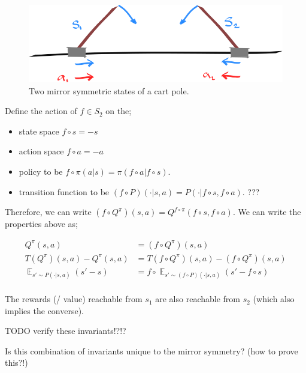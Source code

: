 \begin{figure}[h!]
	\centering
	\includegraphics[width=1\textwidth,height=0.25\textheight]{../../pictures/drawings/cart-pole-mirror.png}
	\caption{Two mirror symmetric states of a cart pole.}
\end{figure}

Define the action of $f \in S_2$ on the;

\begin{itemize}
	\tightlist
	\item state space $f \circ s = -s$
	\item action space $f \circ a = -a$
 	\item policy to be $f \circ \pi(a | s) = \pi(f \circ a | f \circ s)$.
	\item transition function to be $(f \circ P)(\cdot | s, a) = P(\cdot| f \circ s, f \circ a)$. ???
\end{itemize}

Therefore, we can write $(f \circ Q^{\pi})(s, a) = Q^{f \circ \pi}(f \circ s, f \circ a)$.
We can write the properties above as;

\begin{align*}
Q^\pi(s, a) &= (f \circ Q^{\pi})(s, a) \tag{expected return}\\
T(Q^\pi)(s,a) - Q^\pi(s,a) &=T(f \circ Q^\pi)(s, a) - (f \circ Q^\pi)(s,a) \tag{Bellman residual}\\
\mathop{\mathbb E}_{s' \sim P(\cdot| s, a)} (s' - s) &= f \circ \mathop{\mathbb E}_{s' \sim (f \circ P)(\cdot| s, a)} (s' - f \circ s) \tag{change in state}\\
\end{align*}
\footnotemark[14]

The rewards (/ value) reachable from $s_1$ are also reachable from $s_2$ (which also implies the converse).

{\color{red}TODO verify these invariants!?!?}

Is this combination of invariants unique to the mirror symmetry? (how to prove this?!)

